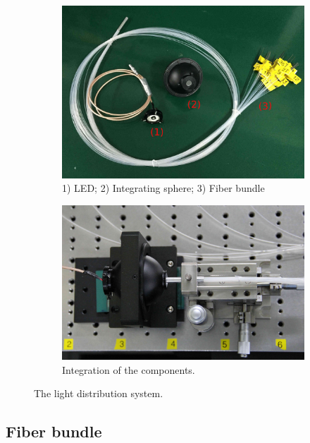 \documentclass{JINST}
\begin{document}
\begin{figure}[tbp]
	
	\begin{subfigure}[t]{0.5\textwidth}
		\includegraphics[width=0.98\linewidth]{fibre_led_insphere_crop.jpg}
		\caption{1) LED; 2) Integrating sphere; 3) Fiber bundle}
		\label{fig:FIG2_a}
	\end{subfigure}
	\begin{subfigure}[t]{0.5\textwidth}
		\includegraphics[width=0.98\linewidth]{light_source1_crop.jpg}
		\caption{Integration of the components.}
		\label{fig:FIG2_b}
	\end{subfigure}
	
	\caption{The light distribution system.}
	\label{fig:FIG2}
\end{figure}

\subsection{Fiber bundle}
\label{sec:fiber_bundle}
	
\end{document}
